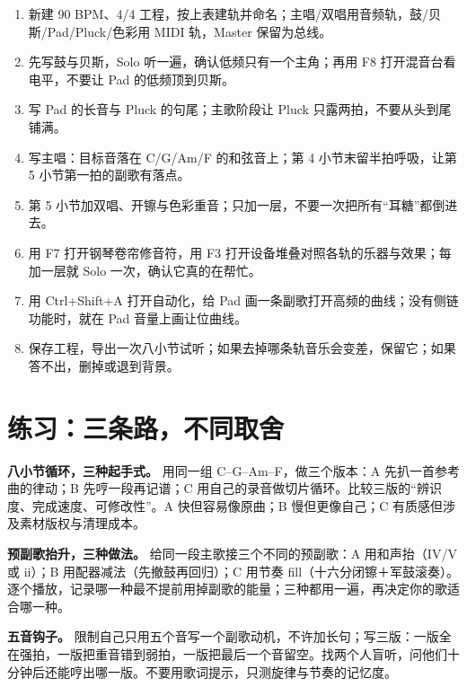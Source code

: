 \begin{sloppypar}
\begin{enumerate}
\item 新建 90 BPM、4/4 工程，按上表建轨并命名；主唱/双唱用音频轨，鼓/贝斯/Pad/Pluck/色彩用 MIDI 轨，Master 保留为总线。
\item 先写鼓与贝斯，Solo 听一遍，确认低频只有一个主角；再用 F8 打开混音台看电平，不要让 Pad 的低频顶到贝斯。
\item 写 Pad 的长音与 Pluck 的句尾；主歌阶段让 Pluck 只露两拍，不要从头到尾铺满。
\item 写主唱：目标音落在 C/G/Am/F 的和弦音上；第 4 小节末留半拍呼吸，让第 5 小节第一拍的副歌有落点。
\item 第 5 小节加双唱、开镲与色彩重音；只加一层，不要一次把所有“耳糖”都倒进去。
\item 用 F7 打开钢琴卷帘修音符，用 F3 打开设备堆叠对照各轨的乐器与效果；每加一层就 Solo 一次，确认它真的在帮忙。
\item 用 Ctrl+Shift+A 打开自动化，给 Pad 画一条副歌打开高频的曲线；没有侧链功能时，就在 Pad 音量上画让位曲线。
\item 保存工程，导出一次八小节试听；如果去掉哪条轨音乐会变差，保留它；如果答不出，删掉或退到背景。
\end{enumerate}
\end{sloppypar}

\section{练习：三条路，不同取舍}
\label{sec:pop-practice}

\begin{exercise}
\textbf{八小节循环，三种起手式。} 用同一组 C–G–Am–F，做三个版本：A 先扒一首参考曲的律动；B 先哼一段再记谱；C 用自己的录音做切片循环。比较三版的“辨识度、完成速度、可修改性”。A 快但容易像原曲；B 慢但更像自己；C 有质感但涉及素材版权与清理成本。
\end{exercise}

\begin{exercise}
\textbf{预副歌抬升，三种做法。} 给同一段主歌接三个不同的预副歌：A 用和声抬（IV/V 或 ii）；B 用配器减法（先撤鼓再回归）；C 用节奏 fill（十六分闭镲＋军鼓滚奏）。逐个播放，记录哪一种最不提前用掉副歌的能量；三种都用一遍，再决定你的歌适合哪一种。
\end{exercise}

\begin{exercise}
\textbf{五音钩子。} 限制自己只用五个音写一个副歌动机，不许加长句；写三版：一版全在强拍，一版把重音错到弱拍，一版把最后一个音留空。找两个人盲听，问他们十分钟后还能哼出哪一版。不要用歌词提示，只测旋律与节奏的记忆度。
\end{exercise}

